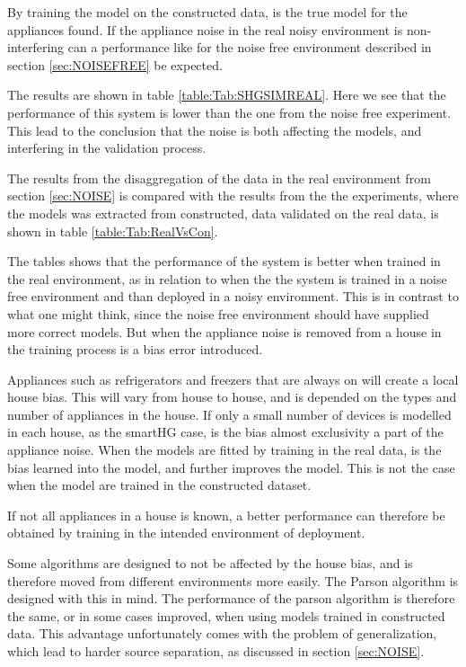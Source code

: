 By training the model on the constructed data, is the true model for the appliances found. If the appliance noise in the real noisy environment is non-interfering can a performance like for the noise free environment described in section \ref{sec:NOISEFREE} be expected. 




The results are shown in table \ref{table:Tab:SHGSIMREAL}. Here we see that the performance of this system is lower than the one from the noise free experiment. This lead to the conclusion that the noise is both affecting the models, and interfering in the validation process.  

The results from the disaggregation of the data in the real environment from section \ref{sec:NOISE} is compared with the results from the the experiments, where the models was extracted from constructed, data validated on the real data, is shown in table \ref{table:Tab:RealVsCon}. 



The tables shows that the performance of the system is better when trained in the real environment, as in relation to when the the system is trained in a noise free environment and than deployed in a noisy environment. This is in contrast to what one might think, since the noise free environment should have supplied more correct models. But when the appliance noise is removed from a house in the training process is a bias error introduced. 

Appliances such as refrigerators and freezers that are always on will create a local house bias. This will vary from house to house, and is depended on the types and number of appliances in the house. If only a small number of devices is modelled in each house, as the smartHG case, is the bias almost exclusivity a part of the appliance noise. When the models are fitted by training in the real data, is the bias learned into the model, and further improves the model. This is not the case when the model are trained in the constructed dataset. 

If not all appliances in a house is known, a better performance can therefore be obtained by training in the intended environment of deployment. 

Some algorithms are designed to not be affected by the house bias, and is therefore moved from different environments more easily. The Parson algorithm is designed with this in mind. The performance of the parson algorithm is therefore the same, or in some cases improved, when using models trained in constructed data. This advantage unfortunately comes with the problem of generalization, which lead to harder source separation, as discussed in section \ref{sec:NOISE}. 


